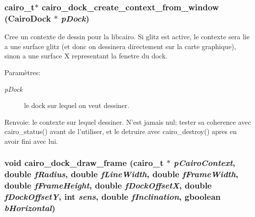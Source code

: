 \subsubsection{\setlength{\rightskip}{0pt plus 5cm}cairo\_\-t$\ast$ cairo\_\-dock\_\-create\_\-context\_\-from\_\-window ({\bf CairoDock} $\ast$ {\em pDock})}\label{cairo-dock-draw_8h_50f5a04dababbd88ddb1e4c9428238ea}


Cree un contexte de dessin pour la libcairo. Si glitz est active, le contexte sera lie a une surface glitz (et donc on dessinera directement sur la carte graphique), sinon a une surface X representant la fenetre du dock. \begin{Desc}
\item[Paramètres:]
\begin{description}
\item[{\em pDock}]le dock sur lequel on veut dessiner. \end{description}
\end{Desc}
\begin{Desc}
\item[Renvoie:]le contexte sur lequel dessiner. N'est jamais nul; tester sa coherence avec cairo\_\-status() avant de l'utiliser, et le detruire avec cairo\_\-destroy() apres en avoir fini avec lui. \end{Desc}
\subsubsection{\setlength{\rightskip}{0pt plus 5cm}void cairo\_\-dock\_\-draw\_\-frame (cairo\_\-t $\ast$ {\em pCairoContext}, double {\em fRadius}, double {\em fLineWidth}, double {\em fFrameWidth}, double {\em fFrameHeight}, double {\em fDockOffsetX}, double {\em fDockOffsetY}, int {\em sens}, double {\em fInclination}, gboolean {\em bHorizontal})}\label{cairo-dock-draw_8h_4c114b58259893749f206d02ba419da9}


